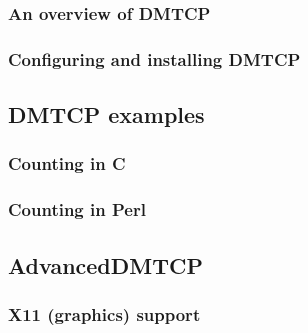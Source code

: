 \documentclass[compress]{beamer}
\begin{document}
\begin{frame}
\frametitle{An overview of DMTCP}



\end{frame}


\begin{frame}
\frametitle{Configuring and installing DMTCP}


\end{frame}


\subsection{DMTCP examples}   %


\begin{frame}
\frametitle{Counting in C}


\end{frame}


\begin{frame}
\frametitle{Counting in Perl}

\end{frame}


\subsection{AdvancedDMTCP}    %

\begin{frame}
\frametitle{X11 (graphics) support}


\end{frame}
\end{document}

